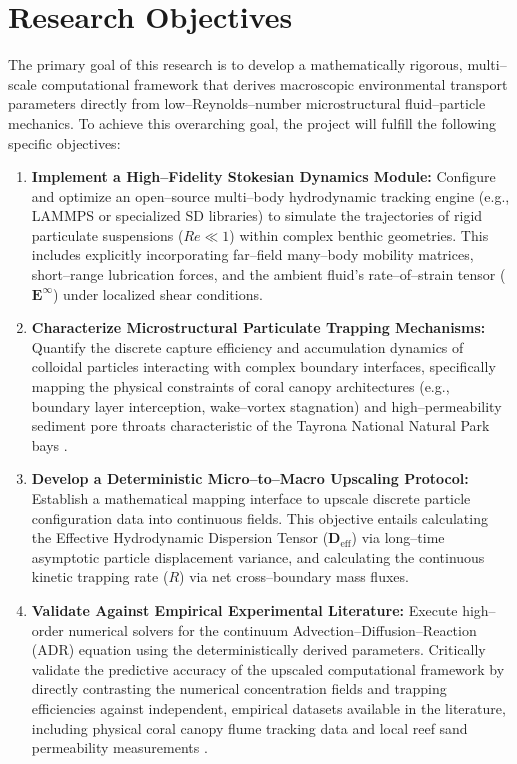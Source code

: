 \section{Research Objectives}
\label{sec:objectives}

The primary goal of this research is to develop a mathematically rigorous, multi--scale computational framework that derives macroscopic environmental transport parameters directly from low--Reynolds--number microstructural fluid--particle mechanics. To achieve this overarching goal, the project will fulfill the following specific objectives:

\begin{enumerate}
    \item \textbf{Implement a High--Fidelity Stokesian Dynamics Module:} Configure and optimize an open--source multi--body hydrodynamic tracking engine (e.g., LAMMPS or specialized SD libraries) to simulate the trajectories of rigid particulate suspensions ($Re \ll 1$) within complex benthic geometries. This includes explicitly incorporating far--field many--body mobility matrices, short--range lubrication forces, and the ambient fluid's rate--of--strain tensor ($\bm{{E}}^{\infty}$) under localized shear conditions.
    \item \textbf{Characterize Microstructural Particulate Trapping Mechanisms:} Quantify the discrete capture efficiency and accumulation dynamics of colloidal particles interacting with complex boundary interfaces, specifically mapping the physical constraints of coral canopy architectures (e.g., boundary layer interception, wake--vortex stagnation) and high--permeability sediment pore throats characteristic of the Tayrona National Natural Park bays \cite{goldman1967shear, monismith2007hydrodynamics, sen2010lightdriven}.
    \item \textbf{Develop a Deterministic Micro--to--Macro Upscaling Protocol:} Establish a mathematical mapping interface to upscale discrete particle configuration data into continuous fields. This objective entails calculating the Effective Hydrodynamic Dispersion Tensor ($\bm{D}_{\text{eff}}$) via long--time asymptotic particle displacement variance, and calculating the continuous kinetic trapping rate ($R$) via net cross--boundary mass fluxes.
    \item \textbf{Validate Against Empirical Experimental Literature:} Execute high--order numerical solvers for the continuum Advection--Diffusion--Reaction (ADR) equation using the deterministically derived parameters. Critically validate the predictive accuracy of the upscaled computational framework by directly contrasting the numerical concentration fields and trapping efficiencies against independent, empirical datasets available in the literature, including physical coral canopy flume tracking data and local reef sand permeability measurements \cite{mendrik2024microplastic, reidenbach2006boundary}.
\end{enumerate}
